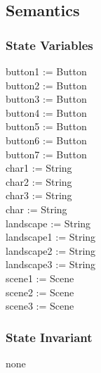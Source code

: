 \documentclass[12pt, titlepage]{article}
\begin{document}
\subsection {Semantics}
\subsubsection {State Variables}
button1 := Button\\
button2 := Button\\
button3 := Button\\
button4 := Button\\
button5 := Button\\
button6 := Button\\
button7 := Button\\
char1 := String\\
char2 := String\\
char3 := String\\
char := String\\
landscape := String\\
landscape1 := String\\
landscape2 := String\\
landscape3 := String\\
scene1 := Scene\\
scene2 := Scene\\
scene3 := Scene\\
\subsubsection {State Invariant}
none
\end{document}
